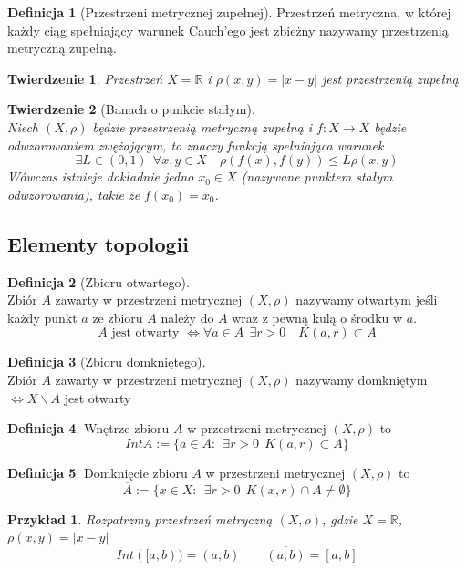 \documentclass[12pt,a4paper]{article}
\newtheorem{tw}{Twierdzenie}
\newtheorem{przyklad}{Przykład}
\theoremstyle{definition}
\newtheorem{df}{Definicja}
\begin{document}
\begin{df}[Przestrzeni metrycznej zupełnej]
Przestrzeń metryczna, w której każdy ciąg spełniający warunek Cauch'ego jest zbieżny nazywamy przestrzenią metryczną zupełną.
\end{df}

\begin{tw}
Przestrzeń $X = \mathbb{R}$ i $\rho (x,y) = |x-y|$ jest przestrzenią zupełną
\end{tw}

\begin{tw}[Banach o punkcie stałym]~\\
Niech $(X, \rho)$ będzie przestrzenią metryczną zupełną i $f: X \to X$ będzie odwzorowaniem zwężającym, to znaczy funkcją spełniająca warunek
$$ \exists L\in (0,1) ~~ \forall x,y\in X \quad \rho (f(x), f(y)) \leqslant L\rho (x, y) $$
Wówczas istnieje dokładnie jedno $x_0 \in X$ (nazywane punktem stałym odwzorowania), takie że $f(x_0) = x_0$. 
\end{tw}


\subsection{Elementy topologii}
\begin{df}[Zbioru otwartego]~\\
Zbiór $A$ zawarty w przestrzeni metrycznej $(X, \rho)$ nazywamy otwartym jeśli każdy punkt $a$ ze zbioru $A$ należy do $A$ wraz z pewną kulą o środku w $a$.\\
$$A \text{ jest otwarty } \Leftrightarrow \forall a\in A ~~ \exists r>0 \quad K(a, r) \subset A$$
\end{df}
\begin{df}[Zbioru domkniętego]~\\
Zbiór $A$ zawarty w przestrzeni metrycznej $(X, \rho)$ nazywamy domkniętym $ \Leftrightarrow X \smallsetminus A$ jest otwarty
\end{df}

\begin{df}
Wnętrze zbioru $A$ w przestrzeni metrycznej $(X, \rho)$ to 
$$ IntA := \{a\in A: ~~ \exists r>0 ~~ K(a,r) \subset A \} $$
\end{df}
\begin{df}
Domknięcie zbioru $A$ w przestrzeni metrycznej $(X, \rho)$ to 
$$ \overline{A} := \{x\in X: ~~ \exists r>0 ~~ K(x,r) \cap A \neq \emptyset \} $$
\end{df}

\begin{przyklad}
Rozpatrzmy przestrzeń metryczną $(X, \rho)$, gdzie $X = \mathbb{R}$, $\rho (x,y) = |x-y|$\\
$$Int([a,b)) = (a,b) \quad\quad \overline{(a,b)} = [a,b]$$
\end{przyklad}
\end{document}
